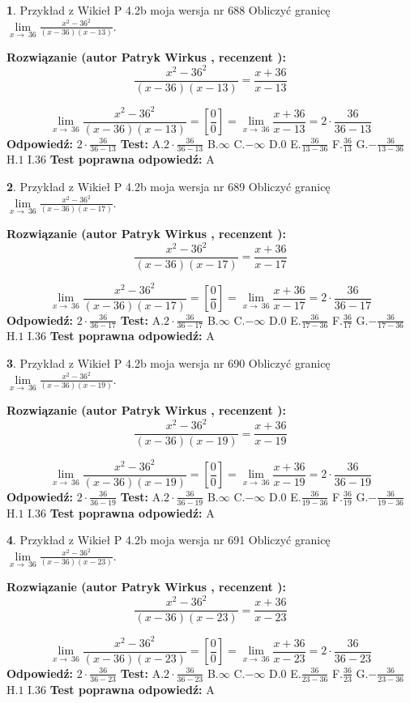 \documentclass[12pt, a4paper]{article}
\theoremstyle{definition} %
\newtheorem{zad}{}
\newcommand{\zadStart}[1]{\begin{zad}#1\newline}
\newcommand{\zadStop}{\end{zad}}
\newcommand{\rozwStart}[2]{\noindent \textbf{Rozwiązanie (autor #1 , recenzent #2): }\newline}
\newcommand{\rozwStop}{\newline}
\newcommand{\odpStart}{\noindent \textbf{Odpowiedź:}\newline}
\newcommand{\odpStop}{\newline}
\newcommand{\testStart}{\noindent \textbf{Test:}\newline}
\newcommand{\testStop}{\newline}
\newcommand{\kluczStart}{\noindent \textbf{Test poprawna odpowiedź:}\newline}
\newcommand{\kluczStop}{\newline}
\begin{document}
\zadStart{Przykład z Wikieł P 4.2b moja wersja nr 688}
Obliczyć granicę $\lim\limits_{x\to\ 36}\frac{x^{2}-36^{2}}{(x-36)(x-13)}$.
\zadStop
\rozwStart{Patryk Wirkus}{}
$$\frac{x^{2}-36^{2}}{(x-36)(x-13)}=\frac{x+36}{x-13}$$

$$\lim\limits_{x\to\ 36}\frac{x^{2}-36^{2}}{(x-36)(x-13)}=[\frac{0}{0}]=\lim\limits_{x\to\ 36}\frac{x+36}{x-13}=2 \cdot \frac{36}{36-13}$$
\rozwStop
\odpStart
$2 \cdot \frac{36}{36-13}$
\odpStop
\testStart
A.$2 \cdot \frac{36}{36-13}$
B.$\infty$
C.$-\infty$
D.$0$
E.$\frac{36}{13-36}$
F.$\frac{36}{13}$
G.$-\frac{36}{13-36}$
H.$1$
I.$36$
\testStop
\kluczStart
A
\kluczStop



\zadStart{Przykład z Wikieł P 4.2b moja wersja nr 689}
Obliczyć granicę $\lim\limits_{x\to\ 36}\frac{x^{2}-36^{2}}{(x-36)(x-17)}$.
\zadStop
\rozwStart{Patryk Wirkus}{}
$$\frac{x^{2}-36^{2}}{(x-36)(x-17)}=\frac{x+36}{x-17}$$

$$\lim\limits_{x\to\ 36}\frac{x^{2}-36^{2}}{(x-36)(x-17)}=[\frac{0}{0}]=\lim\limits_{x\to\ 36}\frac{x+36}{x-17}=2 \cdot \frac{36}{36-17}$$
\rozwStop
\odpStart
$2 \cdot \frac{36}{36-17}$
\odpStop
\testStart
A.$2 \cdot \frac{36}{36-17}$
B.$\infty$
C.$-\infty$
D.$0$
E.$\frac{36}{17-36}$
F.$\frac{36}{17}$
G.$-\frac{36}{17-36}$
H.$1$
I.$36$
\testStop
\kluczStart
A
\kluczStop



\zadStart{Przykład z Wikieł P 4.2b moja wersja nr 690}
Obliczyć granicę $\lim\limits_{x\to\ 36}\frac{x^{2}-36^{2}}{(x-36)(x-19)}$.
\zadStop
\rozwStart{Patryk Wirkus}{}
$$\frac{x^{2}-36^{2}}{(x-36)(x-19)}=\frac{x+36}{x-19}$$

$$\lim\limits_{x\to\ 36}\frac{x^{2}-36^{2}}{(x-36)(x-19)}=[\frac{0}{0}]=\lim\limits_{x\to\ 36}\frac{x+36}{x-19}=2 \cdot \frac{36}{36-19}$$
\rozwStop
\odpStart
$2 \cdot \frac{36}{36-19}$
\odpStop
\testStart
A.$2 \cdot \frac{36}{36-19}$
B.$\infty$
C.$-\infty$
D.$0$
E.$\frac{36}{19-36}$
F.$\frac{36}{19}$
G.$-\frac{36}{19-36}$
H.$1$
I.$36$
\testStop
\kluczStart
A
\kluczStop



\zadStart{Przykład z Wikieł P 4.2b moja wersja nr 691}
Obliczyć granicę $\lim\limits_{x\to\ 36}\frac{x^{2}-36^{2}}{(x-36)(x-23)}$.
\zadStop
\rozwStart{Patryk Wirkus}{}
$$\frac{x^{2}-36^{2}}{(x-36)(x-23)}=\frac{x+36}{x-23}$$

$$\lim\limits_{x\to\ 36}\frac{x^{2}-36^{2}}{(x-36)(x-23)}=[\frac{0}{0}]=\lim\limits_{x\to\ 36}\frac{x+36}{x-23}=2 \cdot \frac{36}{36-23}$$
\rozwStop
\odpStart
$2 \cdot \frac{36}{36-23}$
\odpStop
\testStart
A.$2 \cdot \frac{36}{36-23}$
B.$\infty$
C.$-\infty$
D.$0$
E.$\frac{36}{23-36}$
F.$\frac{36}{23}$
G.$-\frac{36}{23-36}$
H.$1$
I.$36$
\testStop
\kluczStart
A
\kluczStop
\end{document}
